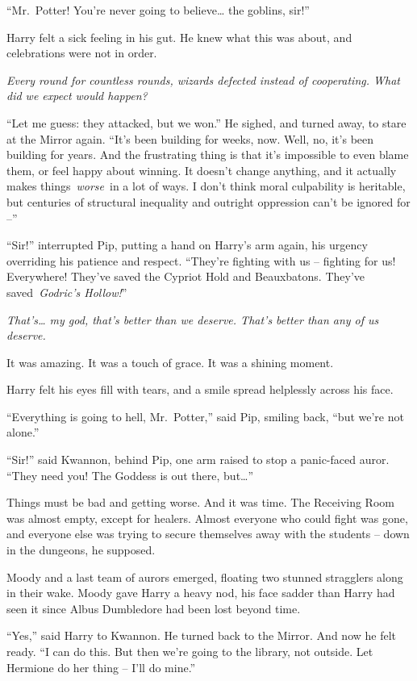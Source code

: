 ``Mr.~Potter! You're never going to believe\ldots{} the goblins, sir!''

Harry felt a sick feeling in his gut. He knew what this was about, and
celebrations were not in order.

\emph{Every round for countless rounds, wizards defected instead of
cooperating. What did we expect would happen?}

``Let me guess: they attacked, but we won.'' He sighed, and turned away,
to stare at the Mirror again. ``It's been building for weeks, now. Well,
no, it's been building for years. And the frustrating thing is that it's
impossible to even blame them, or feel happy about winning. It doesn't
change anything, and it actually makes things~\emph{worse}~in a lot of
ways. I don't think moral culpability is heritable, but centuries of
structural inequality and outright oppression can't be ignored for --''

``Sir!'' interrupted Pip, putting a hand on Harry's arm again, his
urgency overriding his patience and respect. ``They're fighting with us
-- fighting for us! Everywhere! They've saved the Cypriot Hold and
Beauxbatons. They've saved~\emph{Godric's Hollow!}''

\emph{That's\ldots{} my god, that's better than we deserve. That's
better than any of us deserve.}

It was amazing. It was a touch of grace. It was a shining moment.

Harry felt his eyes fill with tears, and a smile spread helplessly
across his face.

``Everything is going to hell, Mr.~Potter,'' said Pip, smiling back,
``but we're not alone.''

``Sir!'' said Kwannon, behind Pip, one arm raised to stop a panic-faced
auror. ``They need you! The Goddess is out there, but\ldots{}''

Things must be bad and getting worse. And it was time. The Receiving
Room was almost empty, except for healers. Almost everyone who could
fight was gone, and everyone else was trying to secure themselves away
with the students -- down in the dungeons, he supposed.

Moody and a last team of aurors emerged, floating two stunned stragglers
along in their wake. Moody gave Harry a heavy nod, his face sadder than
Harry had seen it since Albus Dumbledore had been lost beyond time.

``Yes,'' said Harry to Kwannon. He turned back to the Mirror. And now he
felt ready. ``I can do this. But then we're going to the library, not
outside. Let Hermione do her thing -- I'll do mine.''

